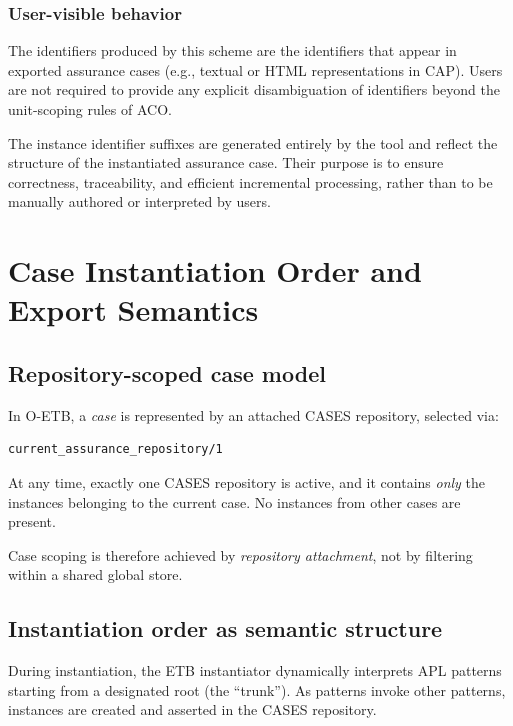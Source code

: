 \documentclass[12pt,twoside,a4paper]{article}
\begin{document}
\subsubsection{User-visible behavior}
\label{sec:aco-user-visible-ids}

The identifiers produced by this scheme are the identifiers that appear in exported assurance cases (e.g., textual or HTML representations in CAP). Users are not required to provide any explicit disambiguation of identifiers beyond the unit-scoping rules of ACO.

The instance identifier suffixes are generated entirely by the tool and reflect the structure of the instantiated assurance case. Their purpose is to ensure correctness, traceability, and efficient incremental processing, rather than to be manually authored or interpreted by users.


\section{Case Instantiation Order and Export Semantics}
\label{sec:case-instantiation-export}

\subsection{Repository-scoped case model}
\label{subsec:repository-scoped-case}

In O-ETB, a \emph{case} is represented by an attached CASES repository, selected via:

\begin{verbatim}
current_assurance_repository/1
\end{verbatim}

At any time, exactly one CASES repository is active, and it contains \emph{only} the instances belonging to the current case. No instances from other cases are present.

Case scoping is therefore achieved by \emph{repository attachment}, not by filtering within a shared global store.

\subsection{Instantiation order as semantic structure}
\label{subsec:instantiation-order-semantics}

During instantiation, the ETB instantiator dynamically interprets APL patterns starting from a designated root (the ``trunk''). As patterns invoke other patterns, instances are created and asserted in the CASES repository.
\end{document}
